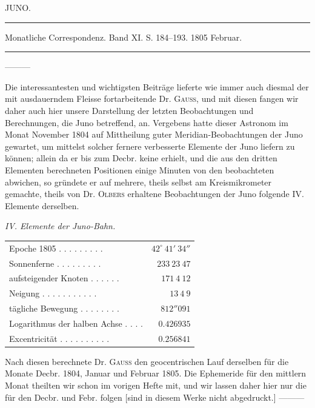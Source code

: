 \clearpage
{}
\hypertarget{native-265-lower}{}
\begin{center}
JUNO.

\rule{0.6\linewidth}{0.4pt}

Monatliche Correspondenz. Band XI. S. 184–193. 1805 Februar.

\rule{0.6\linewidth}{0.4pt}
\end{center}

—\quad—\quad—

Die interessantesten und wichtigsten Beiträge lieferte wie immer auch diesmal der mit ausdauerndem Fleisse fortarbeitende Dr. \textsc{Gauss}, und mit diesen fangen wir daher auch hier unsere Darstellung
der letzten Beobachtungen und Berechnungen, die Juno betreffend, an. Vergebens hatte dieser Astronom im Monat November 1804 auf Mittheilung guter Meridian-Beobachtungen der Juno gewartet, um
mittelst solcher fernere verbesserte Elemente der Juno liefern zu können; allein da er bis zum Decbr.
keine erhielt, und die aus den dritten Elementen berechneten Positionen einige Minuten von den beobachteten abwichen, so gründete er auf mehrere, theils selbst am Kreismikrometer gemachte, theils von
Dr. \textsc{Olbers} erhaltene Beobachtungen der Juno folgende IV. Elemente derselben.

\begin{center}
\emph{IV. Elemente der Juno-Bahn.}
\end{center}

\begin{center}
\begingroup\fontsize{9}{11}\selectfont\setlength{\tabcolsep}{3pt}\renewcommand{\arraystretch}{1.1}
\begin{tabular}{lr}
Epoche 1805 . . . . . . . . . & $42^\circ\ 41'\ 34''$ \\
Sonnenferne . . . . . . . . . & $233\ 23\ 47$ \\
aufsteigender Knoten . . . . . . & $171\ 4\ 12$ \\
Neigung . . . . . . . . . . . & $13\ 4\ 9$ \\
tägliche Bewegung . . . . . . . . & $812''091$ \\
Logarithmus der halben Achse . . . . & $0.426935$ \\
Excentricität . . . . . . . . . . & $0.256841$ \\
\end{tabular}\endgroup
\end{center}

\indent Nach diesen berechnete Dr. \textsc{Gauss} den geocentrischen Lauf derselben für die Monate Decbr. 1804,
Januar und Februar 1805. Die Ephemeride für den mittlern Monat theilten wir schon im vorigen Hefte
mit, und wir lassen daher hier nur die für den Decbr. und Febr. folgen [sind in diesem Werke nicht
abgedruckt.] —\quad—\quad—

